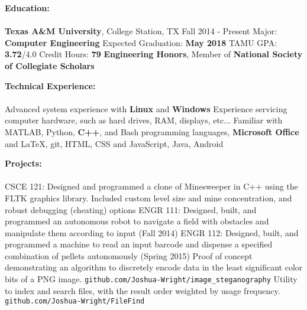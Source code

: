 \documentclass[12pt]{article}
\begin{document}
\begin{flushleft}
\begin{outline}[compactitem]

\newcommand{\upspace}{\vspace{0px}}
\newcommand{\zzz}[1]{\upspace \0 \textbf{#1} \\ \vspace{-0.8\baselineskip} \hrulefill \vspace{-2px} \\ }
\renewcommand\labelitemii{\labelitemi}
\let\oldOne\1\let\oldTwo\2\let\oldThree\3\let\oldFour\4
\renewcommand{\1}{\upspace \oldOne  }
\renewcommand{\2}{\upspace \oldTwo  }
\renewcommand{\3}{\upspace \oldThree}
\renewcommand{\4}{\upspace \oldFour }

\zzz{Education:}
  \1 \textbf{Texas A\&M University}, College Station, TX \hfill Fall 2014 - Present
    \2 Major: \textbf{Computer Engineering}
    \2 Expected Graduation: \textbf{May 2018}
    \2 TAMU GPA: \textbf{3.72}/4.0
    \2 Credit Hours: \textbf{79}
    \2 \textbf{Engineering Honors}, Member of \textbf{National Society of Collegiate Scholars}

\zzz{Technical Experience:}
  \1 Advanced system experience with \textbf{Linux} and \textbf{Windows}
  \1 Experience servicing computer hardware, such as hard drives, RAM, displays, etc...
  \1 Familiar with MATLAB, Python, \textbf{C++}, and Bash programming languages, 
  \textbf{Microsoft Office} and LaTeX, git, HTML, CSS and JavaScript, Java, Android

\zzz{Projects:}
  \1 CSCE 121: Designed and programmed a clone of Minesweeper in C++ using the FLTK graphics library. Included custom level size and mine concentration, and robust debugging (cheating) options
  \1 ENGR 111: Designed, built, and programmed an autonomous robot to navigate 
  a field with obstacles and manipulate them according to input (Fall 2014)
  \1 ENGR 112: Designed, built, and programmed a machine to read an input 
  barcode and dispense a specified combination of pellets autonomously (Spring 2015)
  \1 Proof of concept demonstrating an algorithm to discretely encode data in the least significant color bits of a PNG image.
    \verb|github.com/Joshua-Wright/image_steganography|
  \1 Utility to index and search files, with the result order weighted by usage frequency.
    \verb|github.com/Joshua-Wright/FileFind|


\end{outline}
\end{flushleft}
\end{document}
